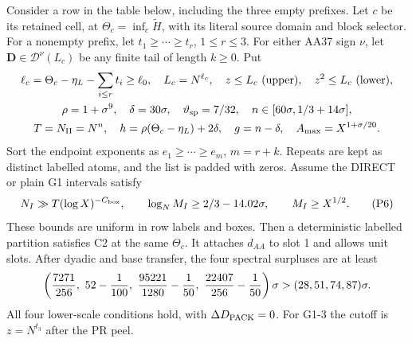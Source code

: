 \begin{lemma}\label{thm:packing-input}
Consider a row in the table below, including the three empty prefixes.
Let $c$ be its retained cell, at $\Theta_c=\inf_c\widetilde H$,
with its literal source domain and block selector.
For a nonempty prefix, let $t_1\ge\cdots\ge t_r$, $1\le r\le3$.
For either AA37 sign $\nu$, let
$\mathbf D\in\mathcal D^\nu(L_c)$ be any finite tail of length $k\ge0$.
Put
\[
\begin{gathered}
 \ell_c=\Theta_c-\eta_L-\sum_{i\le r}t_i\ge\ell_0,\quad L_c=N^{\ell_c},
 \quad z\le L_c\ (\text{upper}),\quad z^2\le L_c\ (\text{lower}),\\
 \rho=1+\sigma^9,\quad \delta=30\sigma,\quad\vartheta_{\rm sp}=7/32,
 \quad n\in[60\sigma,1/3+14\sigma],\\
 T=N_{\rm II}=N^n,\quad h=\rho(\Theta_c-\eta_L)+2\delta,
 \quad g=n-\delta,\quad A_{\max}=X^{1+\sigma/20}.
\end{gathered}
\]
Sort the endpoint exponents as $e_1\ge\cdots\ge e_m$, $m=r+k$.
Repeats are kept as distinct labelled atoms, and the list is padded with zeros.
Assume the DIRECT or plain G1 intervals satisfy
\[
 N_I\gg T(\log X)^{-C_{\rm box}},\qquad
 \log_NM_I\ge2/3-14.02\sigma,\qquad M_I\ge X^{1/2}.
\tag{P6}
\]
These bounds are uniform in row labels and boxes.
Then a deterministic labelled partition satisfies C2 at the same $\Theta_c$.
It attaches $d_{AA}$ to slot 1 and allows unit slots.
After dyadic and base transfer, the four spectral surpluses are at least
\[
 \left({7271\over256},\ 52-{1\over100},\
 {95221\over1280}-{1\over50},\ {22407\over256}-{1\over50}\right)\sigma
 >(28,51,74,87)\sigma.
\]
All four lower-scale conditions hold, with $\Delta D_{\rm PACK}=0$.
For G1-3 the cutoff is $z=N^{t_3}$ after the PR peel.
\end{lemma}


